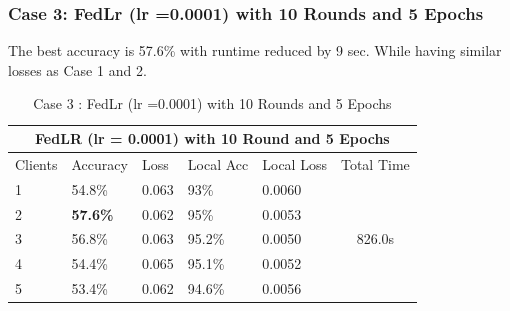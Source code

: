 \documentclass[conference]{IEEEtran}
\begin{document}
 \subsubsection{Case 3: FedLr (lr =0.0001) with 10 Rounds and 5 Epochs}
The best accuracy is 57.6\% with runtime reduced by 9 sec. While having similar losses as Case 1 and 2.
 \begin{table}[ht]
 	\centering
 	\caption{Case 3 : FedLr (lr =0.0001) with 10 Rounds and 5 Epochs}
 		\begin{tabular}{|lllllc|}
 			\hline
 			\multicolumn{6}{|c|}{FedLR (lr = 0.0001) with 10 Round and 5 Epochs}                                                                                                                            \\ \hline
 			\multicolumn{1}{|l|}{Clients} & \multicolumn{1}{l|}{Accuracy} & \multicolumn{1}{l|}{Loss}  & \multicolumn{1}{l|}{Local Acc} & \multicolumn{1}{l|}{Local Loss} & \multicolumn{1}{l|}{Total Time} \\ \hline
 			\multicolumn{1}{|l|}{1}       & \multicolumn{1}{l|}{54.8\%}   & \multicolumn{1}{l|}{0.063} & \multicolumn{1}{l|}{93\%}      & \multicolumn{1}{l|}{0.0060}     & \multirow{5}{*}{826.0s}         \\ \cline{1-5}
 			\multicolumn{1}{|l|}{2}       & \multicolumn{1}{l|}{\textbf{57.6\%}}   & \multicolumn{1}{l|}{0.062} & \multicolumn{1}{l|}{95\%}      & \multicolumn{1}{l|}{0.0053}     &                                 \\ \cline{1-5}
 			\multicolumn{1}{|l|}{3}       & \multicolumn{1}{l|}{56.8\%}   & \multicolumn{1}{l|}{0.063} & \multicolumn{1}{l|}{95.2\%}    & \multicolumn{1}{l|}{0.0050}     &                                 \\ \cline{1-5}
 			\multicolumn{1}{|l|}{4}       & \multicolumn{1}{l|}{54.4\%}   & \multicolumn{1}{l|}{0.065} & \multicolumn{1}{l|}{95.1\%}    & \multicolumn{1}{l|}{0.0052}     &                                 \\ \cline{1-5}
 			\multicolumn{1}{|l|}{5}       & \multicolumn{1}{l|}{53.4\%}   & \multicolumn{1}{l|}{0.062} & \multicolumn{1}{l|}{94.6\%}    & \multicolumn{1}{l|}{0.0056}     &                                 \\ \hline
 		\end{tabular}%
 \end{table}
 
\end{document}
